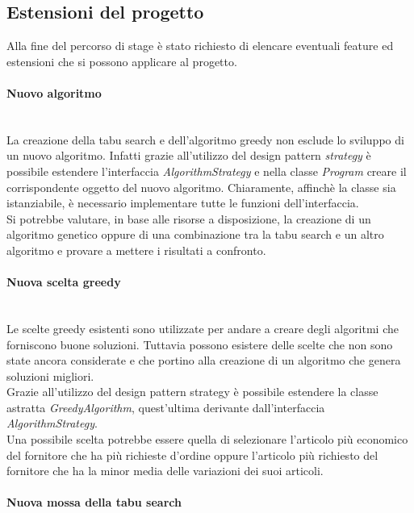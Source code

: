 \subsection{Estensioni del progetto}
\label{sec:estensioni-progetto}
\noindent Alla fine del percorso di stage è stato richiesto di
elencare eventuali feature ed estensioni che si possono
applicare al progetto.
\vspace*{0.3cm}
\noindent \paragraph{Nuovo algoritmo}\hfill\\
La creazione della tabu search e dell'algoritmo greedy non esclude
lo sviluppo di un nuovo algoritmo. Infatti grazie all'utilizzo del design
pattern \textit{strategy} è possibile estendere l'interfaccia
\textit{AlgorithmStrategy} e nella classe \textit{Program}
creare il corrispondente oggetto del nuovo algoritmo.
Chiaramente, affinchè la classe sia istanziabile, è necessario
implementare tutte le funzioni dell'interfaccia.\\
Si potrebbe valutare, in base alle risorse a disposizione, la creazione di un algoritmo genetico oppure di una combinazione tra la tabu search e un altro algoritmo
e provare a mettere i risultati a confronto.
\vspace*{0.3cm}
\noindent \paragraph{Nuova scelta greedy}\hfill\\
Le scelte greedy esistenti sono utilizzate per andare
a creare degli algoritmi che forniscono buone soluzioni.
Tuttavia possono esistere delle scelte che non sono state ancora
considerate e che portino alla creazione di un algoritmo
che genera soluzioni migliori.\\
Grazie all'utilizzo del design pattern strategy è possibile estendere
la classe astratta \textit{GreedyAlgorithm}, quest'ultima derivante dall'interfaccia
\textit{AlgorithmStrategy}.\\
Una possibile scelta potrebbe essere quella di selezionare
l'articolo più economico del fornitore che ha più richieste d'ordine
oppure l'articolo più richiesto del fornitore
che ha la minor media delle variazioni dei suoi articoli.
\vspace*{0.3cm}
\noindent \paragraph{Nuova mossa della tabu search}\hfill\\
